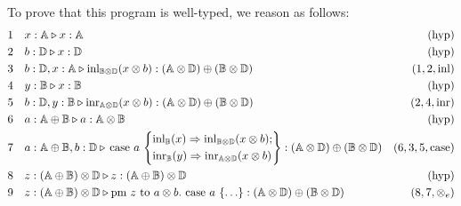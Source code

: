 \begin{example}
To prove that this program is well-typed, we reason as follows:
\begin{equation*}
\begin{split}
1  \hspace{10 pt} & x : \mathbb{A}  \triangleright x : \mathbb{A}  & {(\text{hyp})} \\
2  \hspace{10 pt} & b : \mathbb{D}  \triangleright x : \mathbb{D}  & {(\text{hyp})} \\
3  \hspace{10 pt} & b : \mathbb{D}, x : \mathbb{A}  \triangleright \mathrm{inl}_{\mathbb{B} \otimes \mathbb{D}}(x \otimes b): (\mathbb{A} \otimes \mathbb{D}) \oplus (\mathbb{B} \otimes \mathbb{D})  & {(1,2,\text{inl})} \\
4  \hspace{10 pt} & y : \mathbb{B}  \triangleright x : \mathbb{B}  & {(\text{hyp})} \\
5  \hspace{10 pt} & b : \mathbb{D},y : \mathbb{B}  \triangleright \mathrm{inr}_{\mathbb{A} \otimes \mathbb{D}}(x \otimes b): (\mathbb{A} \otimes \mathbb{D}) \oplus (\mathbb{B} \otimes \mathbb{D})  & {(2,4,\text{inr})} \\
6  \hspace{10 pt} & a : \mathbb{A} \oplus \mathbb{B} \triangleright a : \mathbb{A} \otimes \mathbb{B}  \hspace{10 pt} & {(\text{hyp})} \\ 
7 \hspace{10 pt} &    a: \mathbb{\mathbb{A} \oplus \mathbb{B}},  b: \mathbb{D} \triangleright \, 
\text{case } a \,  
  \left\{
    \begin{aligned} 
    &\mathrm{inl}_{\mathbb{B}}(x) \Rightarrow \mathrm{inl}_{\mathbb{B} \otimes \mathbb{D}}(x \otimes b); \\
    &\mathrm{inr}_{\mathbb{B}}(y) \Rightarrow \mathrm{inr}_{\mathbb{A} \otimes \mathbb{D}}(x \otimes b)   \\ 
  \end{aligned}  
  \right\}: (\mathbb{A} \otimes \mathbb{D}) \oplus (\mathbb{B} \otimes \mathbb{D})  & \text{($6,3,5,\text{case}$)} \\
  8 \hspace{10 pt} & z : \mathbb{(A \oplus B) \otimes D} \triangleright z : \mathbb{(A \oplus B) \otimes D}  \hspace{10 pt} & {(\text{hyp})} \\
9 \hspace{10 pt} &  z:(\mathbb{A} \oplus \mathbb{\mathbb{B}}) \otimes \mathbb{\mathbb{D}} \triangleright \text{pm } z \text{ to } a \otimes b. \text{ case } a\,\left\{ \ldots
    \right\}: (\mathbb{A} \otimes \mathbb{D}) \oplus (\mathbb{B} \otimes \mathbb{D}) & \text{($8,7,\otimes_{e}$)} \\
\end{split}
\end{equation*}



\end{example}
